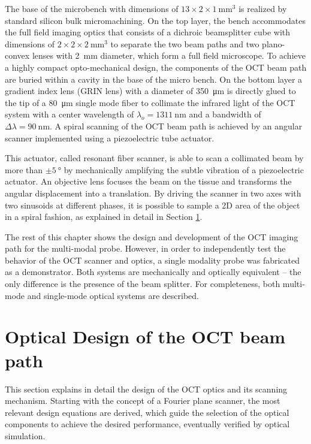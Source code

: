 The base of the microbench with dimensions of $13 \times 2 \times \SI{1}{\milli\meter^3} $ is realized by standard silicon bulk micromachining. On the top layer, the bench accommodates the full field imaging optics that consists of a dichroic beamsplitter cube with dimensions of $2\times 2 \times  \SI{2}{\milli\meter^3}$ to separate the two beam paths and two plano-convex lenses with \SI{2}{\milli\meter} diameter, which form a full field microscope. To achieve a highly compact opto-mechanical design, the components of the OCT beam path are buried within a cavity in the base of the micro bench. On the bottom layer a gradient index lens (GRIN lens) with a diameter of \SI{350}{\micro\meter} is directly glued to the tip of a \SI{80}{\micro\meter} single mode fiber to collimate the infrared light of the OCT system with a center wavelength of $\lambda_o = \SI{1311}{\nano\meter}$ and a bandwidth of $\Delta \lambda = \SI{90}{\nano\meter} $. A spiral scanning of the OCT beam path is achieved by an angular scanner implemented using a piezoelectric tube actuator.

This actuator, called resonant fiber scanner, is able to scan a collimated beam by more than $\pm \SI{5}{\degree}$ by mechanically amplifying the subtle vibration of a piezoelectric actuator.  An objective lens focuses the beam on the tissue and transforms the angular displacement into a translation. By driving the scanner in two axes with two sinusoids at different phases, it is possible to sample a 2D area of the object in a spiral fashion, as explained in detail in Section \ref{sec:Optical}.

The rest of this chapter shows the design and development of the OCT imaging path for the multi-modal probe. However, in order to independently test the behavior of the OCT scanner and optics, a single modality probe was fabricated as a demonstrator. Both systems are mechanically and optically equivalent -- the only difference is the presence of the beam splitter. 
For completeness, both multi-mode and single-mode optical systems are described.


\section{Optical Design of the OCT beam path}
\label{sec:Optical}
This section explains in detail the design of the OCT optics and its scanning mechanism. Starting with the concept of a Fourier plane scanner, the most relevant design equations are derived, which guide the selection of the optical components to achieve the desired performance, eventually verified by optical simulation. 

